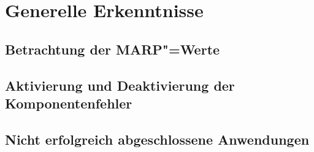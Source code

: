 \section{Generelle Erkenntnisse}
\label{sec:generalResults}


\subsection{Betrachtung der \ac{MARP}"=Werte}
\label{sec:marpValueResults}



\subsection{Aktivierung und Deaktivierung der Komponentenfehler}
\label{sec:faultInjectionEval}


\subsection{Nicht erfolgreich abgeschlossene Anwendungen}
\label{sec:failedAppsEval}





